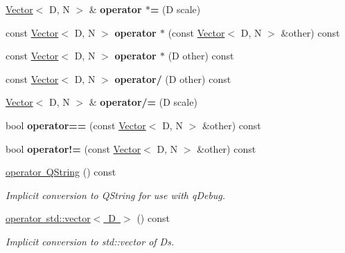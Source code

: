 \begin{DoxyCompactItemize}
\mbox{\hyperlink{classrev_1_1_vector}{Vector}}$<$ D, N $>$ \& {\bfseries operator $\ast$=} (D scale)
\item 
\mbox{\label{classrev_1_1_vector_a713bcaea2f2191a6d5068173ef942361}} 
const \mbox{\hyperlink{classrev_1_1_vector}{Vector}}$<$ D, N $>$ {\bfseries operator $\ast$} (const \mbox{\hyperlink{classrev_1_1_vector}{Vector}}$<$ D, N $>$ \&other) const
\item 
\mbox{\label{classrev_1_1_vector_a3642d5315a4d23303d13399ffa128067}} 
const \mbox{\hyperlink{classrev_1_1_vector}{Vector}}$<$ D, N $>$ {\bfseries operator $\ast$} (D other) const
\item 
\mbox{\label{classrev_1_1_vector_a93b98bc3c56b1d46ab690f410c9e2b60}} 
const \mbox{\hyperlink{classrev_1_1_vector}{Vector}}$<$ D, N $>$ {\bfseries operator/} (D other) const
\item 
\mbox{\label{classrev_1_1_vector_a4ad1cab81b2c2b141de7fd75e6d1ae0d}} 
\mbox{\hyperlink{classrev_1_1_vector}{Vector}}$<$ D, N $>$ \& {\bfseries operator/=} (D scale)
\item 
\mbox{\label{classrev_1_1_vector_a2d21eb7dac0e46815863b08a6c82d6b0}} 
bool {\bfseries operator==} (const \mbox{\hyperlink{classrev_1_1_vector}{Vector}}$<$ D, N $>$ \&other) const
\item 
\mbox{\label{classrev_1_1_vector_a1536ee0a79e9d83078f22997aeb43b64}} 
bool {\bfseries operator!=} (const \mbox{\hyperlink{classrev_1_1_vector}{Vector}}$<$ D, N $>$ \&other) const
\item 
\mbox{\label{classrev_1_1_vector_a92dc8ef3b560e3243fbdd3ca931d0a1c}} 
\mbox{\hyperlink{classrev_1_1_vector_a92dc8ef3b560e3243fbdd3ca931d0a1c}{operator Q\+String}} () const
\begin{DoxyCompactList}\small\item\em Implicit conversion to Q\+String for use with q\+Debug. \end{DoxyCompactList}\item 
\mbox{\label{classrev_1_1_vector_a2292367e0a740d7fe7302e04cc6c16b4}} 
\mbox{\hyperlink{classrev_1_1_vector_a2292367e0a740d7fe7302e04cc6c16b4}{operator std\+::vector$<$ D $>$}} () const
\begin{DoxyCompactList}\small\item\em Implicit conversion to std\+::vector of Ds. \end{DoxyCompactList}\end{DoxyCompactItemize}
